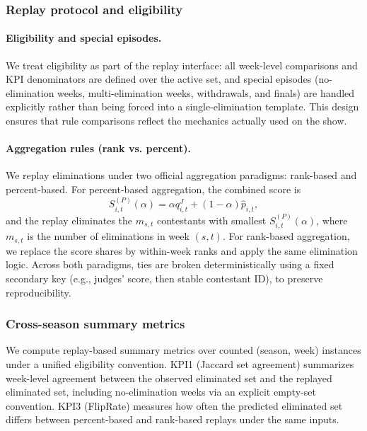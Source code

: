 \subsubsection{Replay protocol and eligibility}\label{subsubsec:replay_protocol_and_eligibility}

\paragraph{Eligibility and special episodes.}
We treat eligibility as part of the replay interface: all week-level comparisons and KPI denominators are defined over the active set,
and special episodes (no-elimination weeks, multi-elimination weeks, withdrawals, and finals) are handled explicitly rather than being forced into a single-elimination template.
This design ensures that rule comparisons reflect the mechanics actually used on the show.

\paragraph{Aggregation rules (rank vs. percent).}
We replay eliminations under two official aggregation paradigms: rank-based and percent-based. For percent-based aggregation,
the combined score is
\[
S^{(P)}_{i,t}(\alpha)=\alpha q^{J}_{i,t}+(1-\alpha)\hat p_{i,t},
\]
and the replay eliminates the $m_{s,t}$ contestants with smallest $S^{(P)}_{i,t}(\alpha)$, where $m_{s,t}$ is the number of eliminations in week $(s,t)$.
For rank-based aggregation, we replace the score shares by within-week ranks and apply the same elimination logic.
Across both paradigms, ties are broken deterministically using a fixed secondary key (e.g., judges' score, then stable contestant ID), to preserve reproducibility.

\subsubsection{Cross-season summary metrics}\label{subsubsec:cross_season_summary_metrics}
We compute replay-based summary metrics over counted (season, week) instances under a unified eligibility convention.
KPI1 (Jaccard set agreement) summarizes week-level agreement between the observed eliminated set and the replayed eliminated set,
including no-elimination weeks via an explicit empty-set convention.
KPI3 (FlipRate) measures how often the predicted eliminated set differs between percent-based and rank-based replays under the same inputs.

